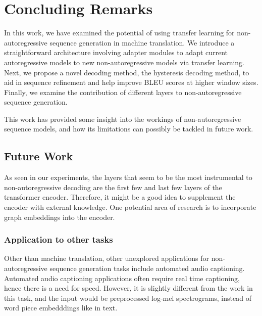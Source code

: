 \section{Concluding Remarks}

In this work, we have examined the potential of using transfer learning for non-autoregressive sequence generation in machine translation. We introduce a straightforward architecture involving adapter modules to adapt current autoregressive models to new non-autoregressive models via transfer learning. Next, we propose a novel decoding method, the hysteresis decoding method, to aid in sequence refinement and help improve BLEU scores at higher window sizes. Finally, we examine the contribution of different layers to non-autoregressive sequence generation.

This work has provided some insight into the workings of non-autoregressive sequence models, and how its limitations can possibly be tackled in future work.


\subsection{Future Work}
As seen in our experiments, the layers that seem to be the most instrumental to non-autoregressive decoding are the first few and last few layers of the transformer encoder. Therefore, it might be a good idea to supplement the encoder with external knowledge. One potential area of research is to incorporate graph embeddings into the encoder. 

\subsubsection{Application to other tasks}
Other than machine translation, other unexplored applications for non-autoregressive sequence generation tasks include automated audio captioning. Automated audio captioning applications often require real time captioning, hence there is a need for speed. However, it is slightly different from the work in this task, and the input would be preprocessed log-mel spectrograms, instead of word piece embedddings like in text. 